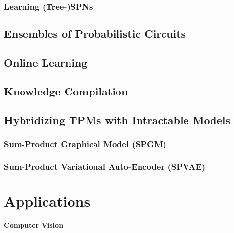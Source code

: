 			\subsubsection{Learning (Tree-)SPNs} %

		\subsection{Ensembles of Probabilistic Circuits} %

		\subsection{Online Learning} %

		\subsection{Knowledge Compilation} %

		\subsection{Hybridizing TPMs with Intractable Models} %

			\subsubsection{Sum-Product Graphical Model (SPGM)} %

			\subsubsection{Sum-Product Variational Auto-Encoder (SPVAE)} %

	\section{Applications} %

		\paragraph{Computer Vision} %

